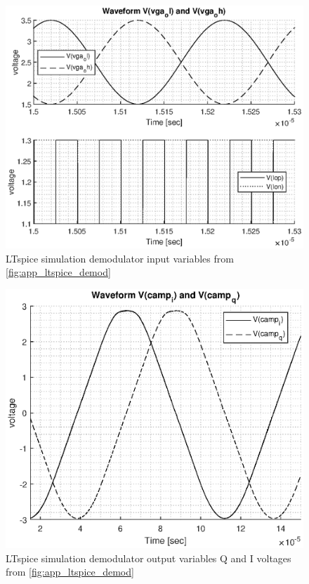 \begin{figure}[htbp]
	\centering
	\includegraphics[width=.8\textwidth]{Figures/3_demod_sim_in.eps}
	\caption[LTspice simulation demodulator input variables]{LTspice simulation demodulator input variables from \cref{fig:app_ltspice_demod}}
	\label{fig:3_demod_sim_in}
\end{figure}
\begin{figure}[htbp]
	\centering
	\includegraphics[width=.8\textwidth]{Figures/3_demod_sim_out.eps}
	\caption[LTspice simulation demodulator output variables]{LTspice simulation demodulator output variables Q and I voltages from \cref{fig:app_ltspice_demod}}
	\label{fig:3_demod_sim_out}
\end{figure}
